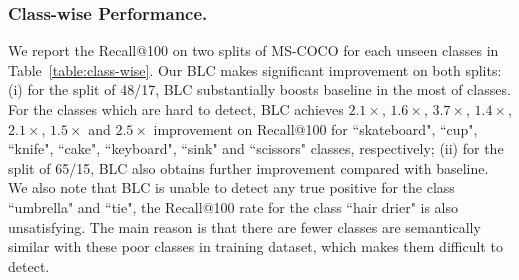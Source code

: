 \documentclass[runningheads]{llncs}
\begin{document}
\subsubsection{Class-wise Performance.}
We report the Recall@100 on two splits of MS-COCO for each unseen classes in Table~\ref{table:class-wise}. Our BLC makes significant improvement on both splits: (i) for the split of 48/17, BLC substantially boosts baseline in the most of classes. For the classes which are hard to detect, BLC achieves $2.1\times$, $1.6\times$, $3.7\times$, $1.4\times$, $2.1\times$, $1.5\times$ and $2.5\times$ improvement on Recall@100 for ``skateboard", ``cup", ``knife", ``cake", ``keyboard", ``sink" and ``scissors" classes, respectively; (ii) for the split of 65/15, BLC also obtains further improvement compared with baseline. We also note that BLC is unable to detect any true positive for the class ``umbrella" and ``tie", the Recall@100 rate for the class ``hair drier" is also unsatisfying. The main reason is that there are fewer classes are semantically similar with these poor classes in training dataset, which makes them difficult to detect.
\setlength{\tabcolsep}{4pt}
\end{document}
